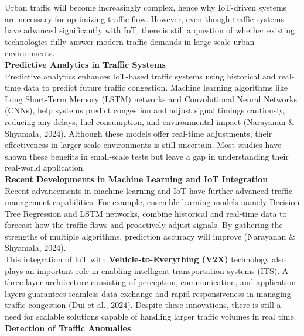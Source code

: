 \documentclass[12pt,a4paper]{article}
\begin{document}
Urban traffic will become increasingly complex, hence why IoT-driven systems are necessary for optimizing traffic flow. However, even though traffic systems have advanced significantly with IoT, there is still a question of whether existing technologies fully answer modern traffic demands in large-scale urban environments. \\

\textbf{Predictive Analytics in Traffic Systems }\\

Predictive analytics enhances IoT-based traffic systems using historical and real-time data to predict future traffic congestion. Machine learning algorithms like Long Short-Term Memory (LSTM) networks and Convolutional Neural Networks (CNNs), help systems predict congestion and adjust signal timings cautiously, reducing any delays, fuel consumption, and environmental impact (Narayanan \& Shyamala, 2024). Although these models offer real-time adjustments, their effectiveness in larger-scale environments is still uncertain. Most studies have shown these benefits in small-scale tests but leave a gap in understanding their real-world application. \\

\textbf{Recent Developments in Machine Learning and IoT Integration }\\

Recent advancements in machine learning and IoT have further advanced traffic management capabilities. For example, ensemble learning models namely Decision Tree Regression and LSTM networks, combine historical and real-time data to forecast how the traffic flows and proactively adjust signals. By gathering the strengths of multiple algorithms, prediction accuracy will improve (Narayanan \& Shyamala, 2024).  \\

This integration of IoT with \textbf{Vehicle-to-Everything (V2X)} technology also plays an important role in enabling intelligent transportation systems (ITS). A three-layer architecture consisting of perception, communication, and application layers guarantees seamless data exchange and rapid responsiveness in managing traffic congestion (Dui et al., 2024). Despite these innovations, there is still a need for scalable solutions capable of handling larger traffic volumes in real time. \\

\textbf{Detection of Traffic Anomalies }\\
\end{document}
